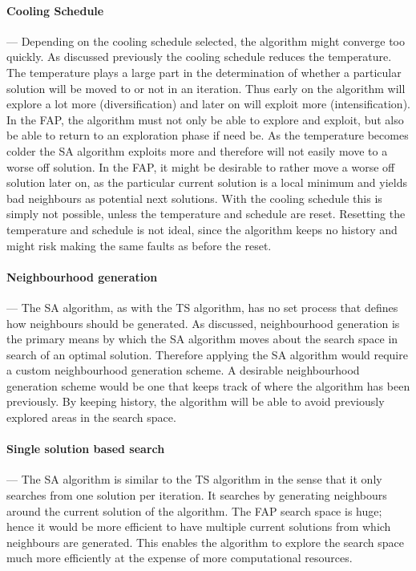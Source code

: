 \paragraph{Cooling Schedule}
--- Depending on the cooling schedule selected, the algorithm might converge too quickly. As discussed previously the cooling schedule reduces the temperature. The temperature plays a large part in the determination of whether a particular solution will be moved to or not in an iteration. Thus early on the algorithm will explore a lot more (diversification) and later on will exploit more (intensification). In the \gls{FAP}, the algorithm must not only be able to explore and exploit, but also be able to return to an exploration phase if need be.
As the temperature becomes colder the \gls{SA} algorithm exploits more and therefore will not easily move to a worse off solution. In the \gls{FAP}, it might be desirable to rather move a worse off solution later on, as the particular current solution is a local minimum and yields bad neighbours as potential next solutions. With the cooling schedule this is simply not possible, unless the temperature and schedule are reset. Resetting the temperature and schedule is not ideal, since the algorithm keeps no history and might risk making the same faults as before the reset.
\paragraph{Neighbourhood generation}
--- The \gls{SA} algorithm, as with the \gls{TS} algorithm, has no set process that defines how neighbours should be generated. As discussed, neighbourhood generation is the primary means by which the \gls{SA} algorithm moves about the search space in search of an optimal solution. Therefore applying the \gls{SA} algorithm would require a custom neighbourhood generation scheme. A desirable neighbourhood generation scheme would be one that keeps track of where the algorithm has been previously. By keeping history, the algorithm will be able to avoid previously explored areas in the search space.
\paragraph{Single solution based search}
--- The \gls{SA} algorithm is similar to the \gls{TS} algorithm in the sense that it only searches from one solution per iteration. It searches by generating neighbours around the current solution of the algorithm. The \gls{FAP} search space is huge; hence it would be more efficient to have multiple current solutions from which neighbours are generated. This enables the algorithm to explore the search space much more efficiently at the expense of more computational resources.

